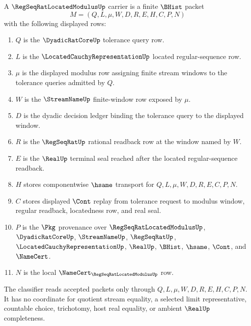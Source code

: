\begin{definition}
\label{def:regseqrat-located-modulus-carrier}
A $\RegSeqRatLocatedModulusUp$ carrier is a finite $\BHist$ packet
$$
M=(Q,L,\mu,W,D,R,E,H,C,P,N)
$$
with the following displayed rows:
\begin{enumerate}
\item $Q$ is the $\DyadicRatCoreUp$ tolerance query row.
\item $L$ is the $\LocatedCauchyRepresentationUp$ located regular-sequence row.
\item $\mu$ is the displayed modulus row assigning finite stream windows to the tolerance queries admitted by $Q$.
\item $W$ is the $\StreamNameUp$ finite-window row exposed by $\mu$.
\item $D$ is the dyadic decision ledger binding the tolerance query to the displayed window.
\item $R$ is the $\RegSeqRatUp$ rational readback row at the window named by $W$.
\item $E$ is the $\RealUp$ terminal seal reached after the located regular-sequence readback.
\item $H$ stores componentwise $\hsame$ transport for $Q,L,\mu,W,D,R,E,C,P,N$.
\item $C$ stores displayed $\Cont$ replay from tolerance request to modulus window, regular readback, locatedness row, and real seal.
\item $P$ is the $\Pkg$ provenance over $\RegSeqRatLocatedModulusUp$, $\DyadicRatCoreUp$, $\StreamNameUp$, $\RegSeqRatUp$, $\LocatedCauchyRepresentationUp$, $\RealUp$, $\BHist$, $\hsame$, $\Cont$, and $\NameCert$.
\item $N$ is the local $\NameCert_{\RegSeqRatLocatedModulusUp}$ row.
\end{enumerate}
The classifier reads accepted packets only through $Q,L,\mu,W,D,R,E,H,C,P,N$. It has no coordinate for quotient stream equality, a selected limit representative, countable choice, trichotomy, host real equality, or ambient $\RealUp$ completeness.
\end{definition}


